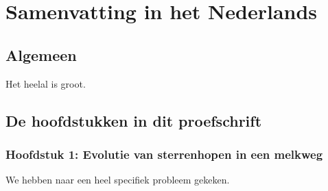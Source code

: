 \chapter{Samenvatting in het Nederlands}

\section{Algemeen}
Het heelal is groot.

\section{De hoofdstukken in dit proefschrift}
\subsection{Hoofdstuk 1: Evolutie van sterrenhopen in een melkweg}
We hebben naar een heel specifiek probleem gekeken.
